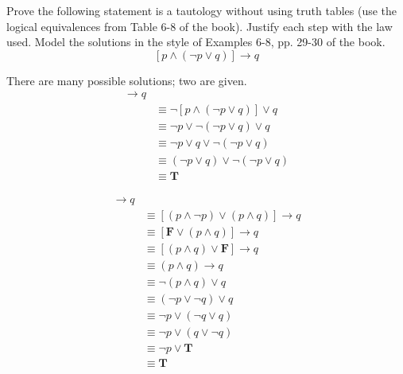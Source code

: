 \documentclass[11pt,addpoints]{exam}
\newcommand{\ra}{\rightarrow}
\begin{document}
\begin{questions}
\question[8] Prove the following statement is a tautology without using truth tables (use the logical equivalences from Table 6-8 of the book).  Justify each step with the law used.  Model the solutions in the style of Examples 6-8, pp. 29-30 of the book.
\[ [ p \wedge (\neg p \vee q) ] \ra q \]
    \ifprintanswers
        \vspace{-30pt}
    \fi
\begin{solution}  There are many possible solutions; two are given.
\small
    \begin{align*}
        [p \wedge (\neg p \vee q) ] \ra q \\
        & \equiv \neg [ p \wedge (\neg p \vee q) ] \vee q \tag{Table 7, rule 1} \\
        & \equiv \neg p \vee \neg (\neg p \vee q) \vee q \tag{DeMorgan's law} \\
        & \equiv \neg p \vee q \vee \neg (\neg p \vee q)   \tag{Commutative} \\
        & \equiv (\neg p \vee q) \vee \neg (\neg p \vee q) \tag{algebra} \\
        & \equiv \mathbf{T} \tag{Negation} 
    \end{align*}

    \begin{align*}
        [ p \wedge (\neg p \vee q) ] \ra q \\
        & \equiv [ (p \wedge \neg p) \vee (p \wedge q) ] \ra q \tag{Distributive} \\
        & \equiv [ \mathbf{F} \vee (p \wedge q) ] \ra q \tag{Negation} \\
        & \equiv [ (p \wedge q) \vee \mathbf{F} ] \ra q \tag{Commutative} \\
        & \equiv (p \wedge q) \ra q \tag{Identity} \\
        & \equiv \neg (p \wedge q) \vee q \tag{Table 7, rule 1} \\
        & \equiv (\neg p \vee \neg q) \vee q \tag{DeMorgans} \\
        & \equiv \neg p \vee (\neg q \vee q) \tag{Associative} \\
        & \equiv \neg p \vee (q \vee \neg q) \tag{Commutative} \\
        & \equiv \neg p \vee \mathbf{T} \tag{Negation} \\
        & \equiv \mathbf{T} \tag{Domination} 
    \end{align*}
\end{solution}


\end{questions}
\end{document}
